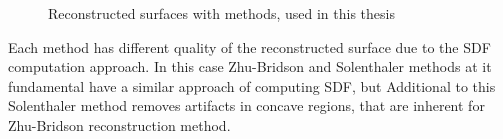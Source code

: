 \begin{figure}[H]
\begin{subfigure}[b]{\textwidth}
	\end{subfigure}
	\caption{Reconstructed surfaces with methods, used in this thesis }
	\label{fig:rec_methods}
\end{figure}
Each method has different quality of the reconstructed surface due to the SDF computation approach. In this case Zhu-Bridson and Solenthaler methods at it fundamental have a similar approach of computing SDF, but Additional to this Solenthaler method removes artifacts in concave regions, that are inherent for Zhu-Bridson reconstruction method.

